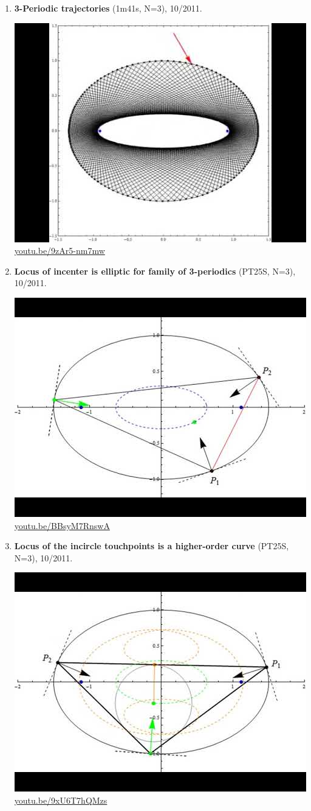 \documentclass[12pt]{amsart}
\begin{document}
\begin{enumerate}[resume]
\item \textbf{3-Periodic trajectories} (1m41s, N=3), 10/2011. 
\begin{center}\includegraphics[width=.5\textwidth]{pics/9zAr5-nm7mw.jpg} \\ 
\href{https://youtu.be/9zAr5-nm7mw}{\url{youtu.be/9zAr5-nm7mw}}\end{center}
% 
\item \textbf{Locus of incenter is elliptic for family of 3-periodics} (PT25S, N=3), 10/2011. 
\begin{center}\includegraphics[width=.5\textwidth]{pics/BBsyM7RnswA.jpg} \\ 
\href{https://youtu.be/BBsyM7RnswA}{\url{youtu.be/BBsyM7RnswA}}\end{center}
% 
\item \textbf{Locus of the incircle touchpoints is a higher-order curve} (PT25S, N=3), 10/2011. 
\begin{center}\includegraphics[width=.5\textwidth]{pics/9xU6T7hQMzs.jpg} \\ 
\href{https://youtu.be/9xU6T7hQMzs}{\url{youtu.be/9xU6T7hQMzs}}\end{center}
% 
\end{enumerate}
\end{document}
